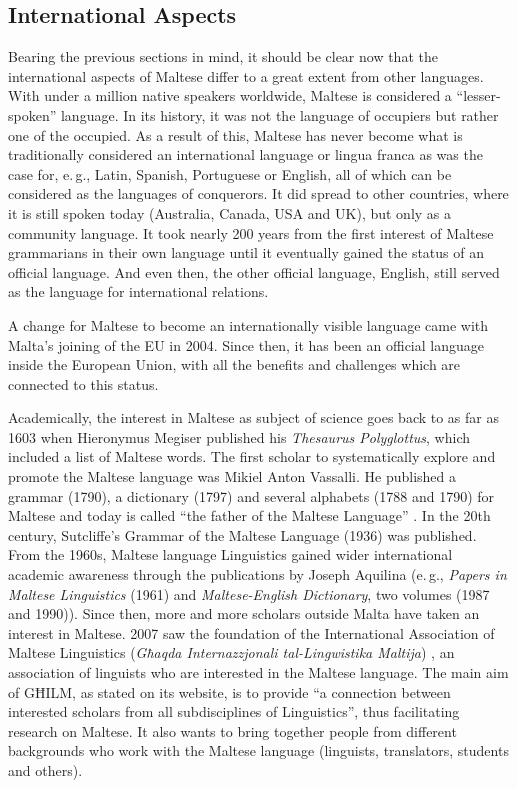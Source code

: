 \begin{multicols}{2}
\subsection{International Aspects}

Bearing the previous sections in mind, it should be clear now that the international aspects of Maltese differ to a great extent from other languages. With under a million native speakers worldwide, Maltese is considered a ``lesser-spoken'' language. In its history, it was not the language of occupiers but rather one of the occupied. As a result of this, Maltese has never become what is traditionally considered an international language or lingua franca as was the case for, e.\,g., Latin, Spanish, Portuguese or English, all of which can be considered as the languages of conquerors. It did spread to other countries, where it is still spoken today (Australia, Canada, USA and UK), but only as a community language. It took nearly 200 years from the first interest of Maltese grammarians in their own language until it eventually gained the status of an official language. And even then, the other official language, English, still served as the language for international relations. 

A change for Maltese to become an internationally visible language came with Malta's joining of the EU in 2004. Since then, it has been an official language inside the European Union, with all the benefits and challenges which are connected to this status.

Academically, the interest in Maltese as subject of science goes back to as far as 1603 when Hieronymus Megiser published his \emph{Thesaurus Polyglottus}, which included a list of Maltese words. The first scholar to systematically explore and promote the Maltese language was Mikiel Anton Vassalli. He published a grammar (1790), a dictionary (1797) and several alphabets (1788 and 1790) for Maltese and today is called ``the father of the Maltese Language'' \cite{Brincat:2011}. In the 20th century, Sutcliffe's Grammar of the Maltese Language (1936) was published. From the 1960s, Maltese language Linguistics gained wider international academic awareness through the publications by Joseph Aquilina (e.\,g., \emph{Papers in Maltese Linguistics} (1961) and \emph{Maltese-English Dictionary}, two volumes (1987 and 1990)). Since then, more and more scholars outside Malta have taken an interest in Maltese. 2007 saw the foundation of the International Association of Maltese Linguistics (\emph{Għaqda Internazzjonali tal-Lingwistika Maltija}) \cite{GHILM1}, an association of linguists who are interested in the Maltese language. The main aim of GĦILM, as stated on its website, is to provide ``a connection between interested scholars from all subdisciplines of Linguistics'', thus facilitating research on Maltese. It also wants to bring together people from different backgrounds who work with the Maltese language (linguists, translators, students and others).



\end{multicols}
